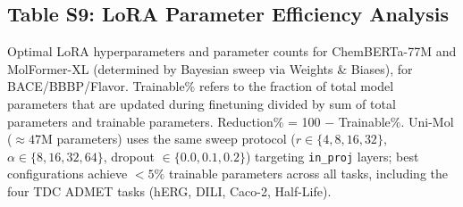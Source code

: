 \documentclass[9pt,a4paper]{article}
\begin{document}
\subsection*{Table S9: LoRA Parameter Efficiency Analysis}

Optimal LoRA hyperparameters and parameter counts for ChemBERTa-77M and MolFormer-XL
(determined by Bayesian sweep via Weights \& Biases), for BACE/BBBP/Flavor.
Trainable\% refers to the fraction of total model parameters that are updated during
finetuning divided by sum of total parameters and trainable parameters. Reduction\% = 100 $-$ Trainable\%.
Uni-Mol ($\approx 47$M parameters) uses the same sweep protocol ($r \in \{4,8,16,32\}$,
$\alpha \in \{8,16,32,64\}$, dropout $\in \{0.0, 0.1, 0.2\}$) targeting
\texttt{in\_proj} layers; best configurations achieve $<5\%$ trainable parameters
across all tasks, including the four TDC ADMET tasks (hERG, DILI, Caco-2, Half-Life).
\end{document}
